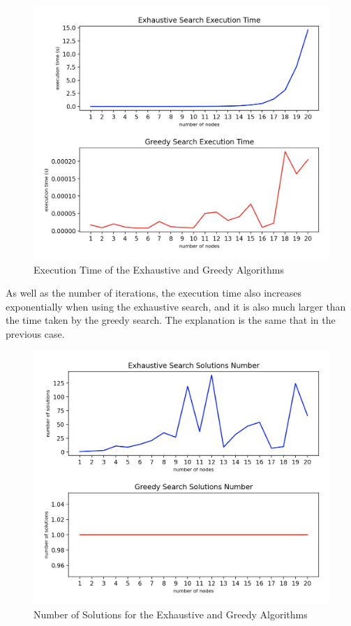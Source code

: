 \documentclass[...]{revdetua}
\begin{document}
\begin{figure}[H]
    \centering
    \includegraphics[width=0.9\columnwidth]{./figures/execution_time_number_0.125.png}
    \caption{Execution Time of the Exhaustive and Greedy Algorithms}
    \label{fig: Execution Time of the Exhaustive and Greedy Algorithms}
\end{figure}

As well as the number of iterations, the execution time also increases exponentially when using the exhaustive search, and it is also much larger than the time taken by the greedy search. The explanation is the same that in the previous case. 

\begin{figure}[H]
    \centering
    \includegraphics[width=0.9\columnwidth]{./figures/solutions_number_0.125.png}
    \caption{Number of Solutions for the Exhaustive and Greedy Algorithms}
    \label{fig: Number of Solutions for the Exhaustive and Greedy Algorithms}
\end{figure}
\end{document}
